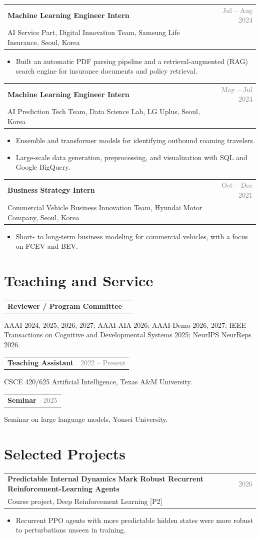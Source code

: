\documentclass[10pt,letterpaper]{article}
\makeatletter
\newcommand{\entry}[3]{%
  \par\vspace{4pt}%
  \begin{tabularx}{\textwidth}{@{}X@{\hspace{1em}}r@{}}
    \textbf{#1} & \textcolor{gray}{#2}\\
    {#3} & \\
  \end{tabularx}\par\vspace{-2pt}}
\newcommand{\entryone}[2]{%
  \par\vspace{4pt}%
  \begin{tabularx}{\textwidth}{@{}X@{\hspace{1em}}r@{}}
    \textbf{#1} & \textcolor{gray}{#2}\\
  \end{tabularx}\par\vspace{-2pt}}
\makeatother
\begin{document}
\entry{Machine Learning Engineer Intern}{Jul -- Aug 2024}
      {AI Service Part, Digital Innovation Team, Samsung Life Insurance, Seoul, Korea}
\begin{itemize}
  \item Built an automatic PDF parsing pipeline and a retrieval-augmented (RAG) search engine for insurance documents and policy retrieval.
\end{itemize}

\entry{Machine Learning Engineer Intern}{May -- Jul 2024}
      {AI Prediction Tech Team, Data Science Lab, LG Uplus, Seoul, Korea}
\begin{itemize}
  \item Ensemble and transformer models for identifying outbound roaming travelers.
  \item Large-scale data generation, preprocessing, and visualization with SQL and Google BigQuery.
\end{itemize}

\entry{Business Strategy Intern}{Oct -- Dec 2021}
      {Commercial Vehicle Business Innovation Team, Hyundai Motor Company, Seoul, Korea}
\begin{itemize}
  \item Short- to long-term business modeling for commercial vehicles, with a focus on FCEV and BEV.
\end{itemize}

\section{Teaching and Service}

\entryone{Reviewer / Program Committee}{}
AAAI 2024, 2025, 2026, 2027; AAAI-AIA 2026; AAAI-Demo 2026, 2027; IEEE Transactions on Cognitive and Developmental Systems 2025; NeurIPS NeurReps 2026.

\entryone{Teaching Assistant}{2022 -- Present}
CSCE 420/625 Artificial Intelligence, Texas A\&M University.

\entryone{Seminar}{2025}
Seminar on large language models, Yonsei University.

\section{Selected Projects}

\entry{Predictable Internal Dynamics Mark Robust Recurrent Reinforcement-Learning Agents}{2026}
      {Course project, Deep Reinforcement Learning [P2]}
\begin{itemize}
  \item Recurrent PPO agents with more predictable hidden states were more robust to perturbations unseen in training.
\end{itemize}
\end{document}
